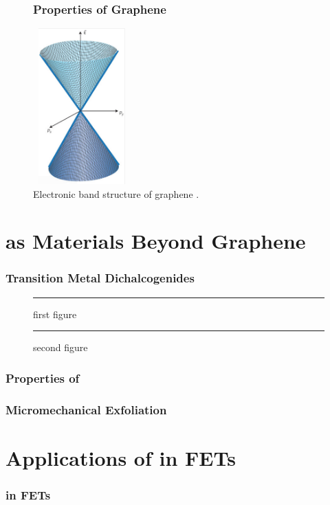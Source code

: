 \documentclass{beamer}
\newcommand{\exedout}{%
  \rule{0.8\textwidth}{0.5\textwidth}%
}
\begin{document}
\begin{frame}
\begin{figure}
\frametitle{Properties of Graphene}
\includegraphics[height=6cm, width=3.75cm]{../present_figs/graphenebandgap}
\caption{Electronic band structure of graphene \cite{Fuhrer2010}.}
\end{figure}
\end{frame}

\section{ as Materials Beyond Graphene}
\begin{frame}
\frametitle{Transition Metal Dichalcogenides}

\begin{figure}
\centering
\begin{minipage}{0.45\textwidth}
\centering
\exedout %
\caption{first figure}
\end{minipage}\hfill
\begin{minipage}{0.45\textwidth}
\centering
\exedout %
\caption{second figure}
\end{minipage}
\end{figure}

\end{frame}

\begin{frame}
\frametitle{Properties of }
\end{frame}

\begin{frame}
\frametitle{Micromechanical Exfoliation}
\end{frame}

\section{Applications of  in FETs}
\begin{frame}
\frametitle{ in FETs}
\end{frame}
\end{document}
